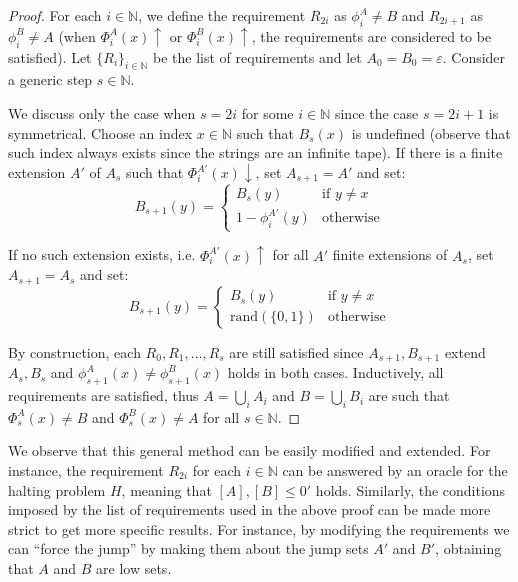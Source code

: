 \documentclass[12pt,a4paper]{article}
\theoremstyle{definition}
\newcommand{\curlyquotes}[1]{\textquotedblleft #1\textquotedblright}
\newcommand{\N}{\mathbb{N}}                     %
\begin{document}
    \begin{proof}
        For each $i \in \N$, we define the requirement $R_{2i}$ as $\phi_i^A \neq B$ and $R_{2i+1}$ as $\phi_{i}^B \neq A$ (when $\Phi_i^A(x) \uparrow$ or $\Phi_i^B(x) \uparrow$, the requirements are considered to be satisfied). Let $\{R_i\}_{i \in \N}$ be the list of requirements and let $A_0 = B_0 = \varepsilon$. Consider a generic step $s \in \N$.
        
        We discuss only the case when $s = 2i$ for some $i \in \N$ since the case $s = 2i+1$ is symmetrical. Choose an index $x \in \N$ such that $B_s(x)$ is undefined (observe that such index always exists since the strings are an infinite tape). If there is a finite extension $A'$ of $A_s$ such that $\Phi_i^{A'}(x) \downarrow$, set $A_{s+1} = A'$ and set:
        \[B_{s+1}(y) = \left \{ \begin{array}{ll}
            B_s(y) & \text{if } y \neq x \\
            1-\phi_i^{A'}(y) & \text{otherwise}
        \end{array}\right .\]

        If no such extension exists, i.e. $\Phi_i^{A'}(x) \uparrow$ for all $A'$ finite extensions of $A_s$, set $A_{s+1} = A_s$ and set:
        \[B_{s+1}(y) = \left \{ \begin{array}{ll}
            B_s(y) & \text{if } y \neq x \\
            \mathrm{rand}(\{0,1\}) & \text{otherwise}
        \end{array}\right .\]

        By construction, each $R_0, R_1, \ldots, R_{s}$ are still satisfied since $A_{s+1}, B_{s+1}$ extend $A_s, B_s$ and $\phi_{s+1}^A(x) \neq \phi_{s+1}^B(x)$ holds in both cases. Inductively, all requirements are satisfied, thus $A = \bigcup_{i} A_i$ and $B = \bigcup_{i} B_i$ are such that $\Phi_s^A(x) \neq B$ and $\Phi_s^B(x) \neq A$ for all $s \in \N$. 
    \end{proof}

    We observe that this general method can be easily modified and extended. For instance,  the requirement $R_{2i}$ for each $i \in \N$ can be answered by an oracle for the halting problem $H$, meaning that $[A],[B] \leq 0'$ holds.
    Similarly, the conditions imposed by the list of requirements used in the above proof can be made more strict to get more specific results. For instance, by modifying the requirements we can \curlyquotes{force the jump} by making them about the jump sets $A'$ and $B'$, obtaining that $A$ and $B$ are low sets.
\end{document}
